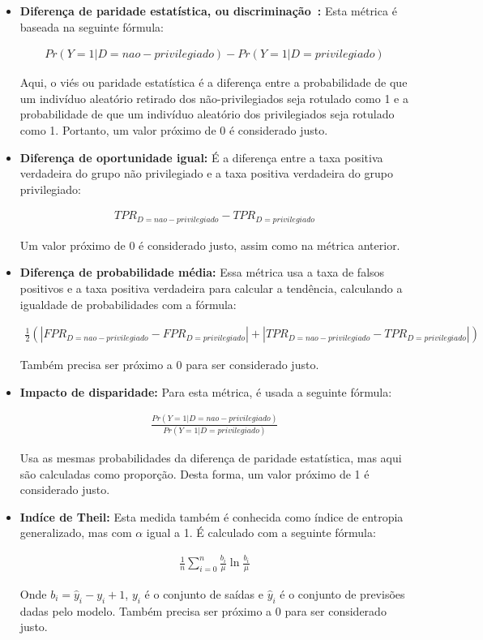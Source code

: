 \documentclass[portugues, 12pt, a4paper]{article}
\begin{document}
\begin{itemize}
\item \textbf{Diferença de paridade estatística, ou discriminação~\citep{Zemel_2013}:} Esta métrica é baseada na seguinte fórmula:

\begin{align*}
Pr(Y=1|D=nao-privilegiado)-Pr(Y=1|D=privilegiado)
\end{align*}
 
Aqui, o viés ou paridade estatística é a diferença entre a probabilidade de que um indivíduo aleatório retirado dos não-privilegiados seja rotulado como 1 e a probabilidade de que um indivíduo aleatório dos privilegiados seja rotulado como 1. Portanto, um valor próximo de 0 é considerado justo.

\item \textbf{Diferença de oportunidade igual:} É a diferença entre a taxa positiva verdadeira do grupo não privilegiado e a taxa positiva verdadeira do grupo privilegiado:

\begin{align*}
TPR_{D=nao-privilegiado} - TPR_{D=privilegiado}
\end{align*}
 
Um valor próximo de 0 é considerado justo, assim como na métrica anterior.

\item \textbf{Diferença de probabilidade média:} Essa métrica usa a taxa de falsos positivos e a taxa positiva verdadeira para calcular a tendência, calculando a igualdade de probabilidades com a fórmula:

\begin{align*}
\frac{1}{2}(|FPR_{D=nao-privilegiado} - FPR_{D=privilegiado}|+|TPR_{D=nao-privilegiado} - TPR_{D=privilegiado}|)
\end{align*}
 
Também precisa ser próximo a 0 para ser considerado justo.

\item \textbf{Impacto de disparidade:} Para esta métrica, é usada a seguinte fórmula:

\begin{align*}
\frac{Pr(Y=1|D=nao-privilegiado)}{Pr(Y=1|D=privilegiado)}
\end{align*}

Usa as mesmas probabilidades da diferença de paridade estatística, mas aqui são calculadas como proporção. Desta forma, um valor próximo de 1 é considerado justo.

\item \textbf{Indíce de Theil:} Esta medida também é conhecida como índice de entropia generalizado, mas com $\alpha$ igual a 1. É calculado com a seguinte fórmula:

\begin{align*}
\frac{1}{n}\sum^{n}_{i=0}\frac{b_i}{\mu}\ln{\frac{b_i}{\mu}}
\end{align*}

Onde $b_i = \hat{y}_i - y_i + 1$, $y_i$ é o conjunto de saídas e $\hat{y}_i$ é o conjunto de previsões dadas pelo modelo. Também precisa ser próximo a 0 para ser considerado justo.

\end{itemize}
\end{document}
